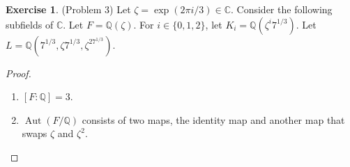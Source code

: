 \documentclass[12pt, psamsfonts]{amsart}
\theoremstyle{definition}
\newtheorem*{exer}{Exercise}
\theoremstyle{remark}
\DeclareMathOperator{\Aut}{Aut}
\numberwithin{equation}{section}
\begin{document}
\begin{exer}{(Problem 3)}
  Let $\zeta = \exp(2\pi i / 3) \in \mathbb{C}$.
  Consider the following subfields of $\mathbb{C}$.
  Let $F = \mathbb{Q}(\zeta)$.
  For $i \in \{ 0, 1, 2 \}$, let $K_i = \mathbb{Q}(\zeta^i7^{1/3})$.
  Let $L = \mathbb{Q}(7^{1/3}, \zeta7^{1/3}, \zeta^27^{1/3})$.
\end{exer}

\begin{proof}
  $ $
  \begin{enumerate}
    \item 
      $[F:\mathbb{Q}] = 3$.
    \item
      $\Aut(F/\mathbb{Q})$ consists of two maps, the identity map and another map that swaps $\zeta$ and $\zeta^2$.
  \end{enumerate}
\end{proof}
\end{document}
